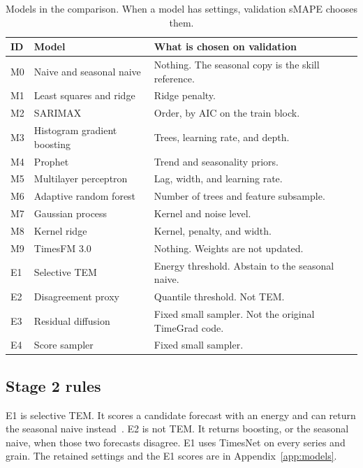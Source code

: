 \begin{table}[t]
  \caption{Models in the comparison.
  When a model has settings, validation sMAPE chooses them.}
  \label{tab:ladder}
  \centering
  \small
  \begin{tabular}{llp{6.6cm}}
    \toprule
    ID & Model & What is chosen on validation \\
    \midrule
    M0 & Naive and seasonal naive & Nothing. The seasonal copy is the skill reference. \\
    M1 & Least squares and ridge & Ridge penalty. \\
    M2 & SARIMAX & Order, by AIC on the train block. \\
    M3 & Histogram gradient boosting & Trees, learning rate, and depth. \\
    M4 & Prophet & Trend and seasonality priors. \\
    M5 & Multilayer perceptron & Lag, width, and learning rate. \\
    M6 & Adaptive random forest & Number of trees and feature subsample. \\
    M7 & Gaussian process & Kernel and noise level. \\
    M8 & Kernel ridge & Kernel, penalty, and width. \\
    M9 & TimesFM 3.0 & Nothing. Weights are not updated. \\
    E1 & Selective TEM & Energy threshold. Abstain to the seasonal naive. \\
    E2 & Disagreement proxy & Quantile threshold. Not TEM. \\
    E3 & Residual diffusion & Fixed small sampler. Not the original TimeGrad code. \\
    E4 & Score sampler & Fixed small sampler. \\
    \bottomrule
  \end{tabular}
\end{table}

\subsection{Stage 2 rules}
\label{sec:energy}

E1 is selective TEM.
It scores a candidate forecast with an energy and can return the seasonal naive instead~\citep{brusokas2025tem}.
E2 is not TEM.
It returns boosting, or the seasonal naive, when those two forecasts disagree.
E1 uses TimesNet on every series and grain.
The retained settings and the E1 scores are in Appendix~\ref{app:models}.

